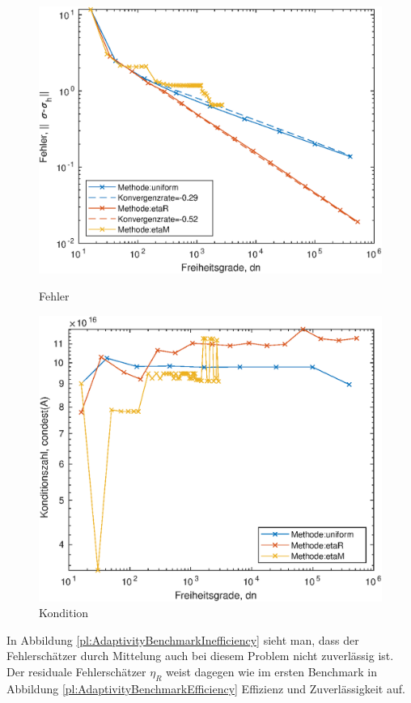 \documentclass{scrartcl}
\begin{document}
\begin{figure}[h]
\centering
\begin{minipage}[b]{0.45\textwidth}
\centering
\includegraphics[width=\textwidth]{Plots/AdaptivityBenchmarkNormSigDiff1}
\caption{Fehler}
\label{pl:AdaptivityBenchmarkNormSigDiff}
\end{minipage}
\hfill
\begin{minipage}[b]{0.45\textwidth}
\centering
\includegraphics[width=1\textwidth]{Plots/AdaptivityBenchmarkCondition1}
\caption{Kondition}
\label{pl:AdaptivityBenchmarkCondition}
\end{minipage}
\end{figure}
In Abbildung \ref{pl:AdaptivityBenchmarkInefficiency} sieht man, dass der Fehlerschätzer durch Mittelung auch bei diesem Problem nicht zuverlässig ist.
Der residuale Fehlerschätzer $\eta_R$ weist dagegen wie im ersten Benchmark in Abbildung \ref{pl:AdaptivityBenchmarkEfficiency} Effizienz und Zuverlässigkeit auf.
\end{document}
